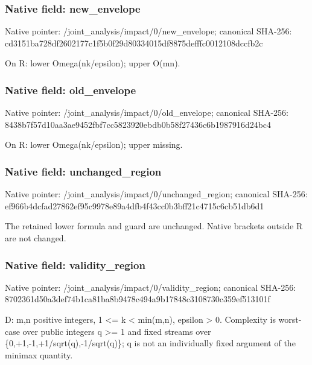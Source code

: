 \documentclass[10pt,a4paper]{article}
\begin{document}
\subsubsection{Native field: new\_\allowbreak{}envelope}
Native pointer: /joint\_\allowbreak{}analysis/impact/0/new\_\allowbreak{}envelope; canonical SHA-256: cd3151ba728df2602177c1f5b0f29d80334015df8875defffc0012108dccfb2c

\begingroup\raggedright\sloppy On R:\allowbreak{} lower Omega(nk/\allowbreak{}epsilon);\allowbreak{} upper O(mn).\par\endgroup

\subsubsection{Native field: old\_\allowbreak{}envelope}
Native pointer: /joint\_\allowbreak{}analysis/impact/0/old\_\allowbreak{}envelope; canonical SHA-256: 8438b7f57d10aa3ae9452fbf7cc5823920ebdb0b58f27436c6b1987916d24bc4

\begingroup\raggedright\sloppy On R:\allowbreak{} lower Omega(nk/\allowbreak{}epsilon);\allowbreak{} upper missing.\par\endgroup

\subsubsection{Native field: unchanged\_\allowbreak{}region}
Native pointer: /joint\_\allowbreak{}analysis/impact/0/unchanged\_\allowbreak{}region; canonical SHA-256: ef966b4dcfad27862ef95c9978e89a4dfb4f43cc0b3bff21c4715c6cb51db6d1

\begingroup\raggedright\sloppy The retained lower formula and guard are unchanged. Native brackets outside R are not changed.\par\endgroup

\subsubsection{Native field: validity\_\allowbreak{}region}
Native pointer: /joint\_\allowbreak{}analysis/impact/0/validity\_\allowbreak{}region; canonical SHA-256: 8702361d50a3def74b1ca81ba8b9478c494a9b17848c3108730c359ef513101f

\begingroup\raggedright\sloppy D:\allowbreak{} m,\allowbreak{}n positive integers,\allowbreak{} 1 <=\allowbreak{} k < min(m,\allowbreak{}n),\allowbreak{} epsilon > 0. Complexity is worst-case over public integers q >=\allowbreak{} 1 and fixed streams over \{0,\allowbreak{}+1,\allowbreak{}-1,\allowbreak{}+1/\allowbreak{}sqrt(q),\allowbreak{}-1/\allowbreak{}sqrt(q)\};\allowbreak{} q is not an individually fixed argument of the minimax quantity.\par\endgroup
\end{document}

